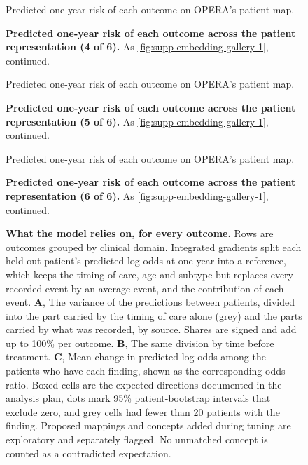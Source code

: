 \begin{figure}[p]
    {Predicted one-year risk of each outcome on OPERA's patient map.}
  \caption{\textbf{Predicted one-year risk of each outcome across the patient representation (4 of 6).}
  As \cref{fig:supp-embedding-gallery-1}, continued.}
  \label{fig:supp-embedding-gallery-4}
\end{figure}

\begin{figure}[p]
    {Predicted one-year risk of each outcome on OPERA's patient map.}
  \caption{\textbf{Predicted one-year risk of each outcome across the patient representation (5 of 6).}
  As \cref{fig:supp-embedding-gallery-1}, continued.}
  \label{fig:supp-embedding-gallery-5}
\end{figure}

\begin{figure}[p]
    {Predicted one-year risk of each outcome on OPERA's patient map.}
  \caption{\textbf{Predicted one-year risk of each outcome across the patient representation (6 of 6).}
  As \cref{fig:supp-embedding-gallery-1}, continued.}
  \label{fig:supp-embedding-gallery-6}
\end{figure}

\begin{figure}[p]
  \caption{\textbf{What the model relies on, for every outcome.} Rows are
  outcomes grouped by clinical domain. Integrated gradients split each held-out
  patient's predicted log-odds at one year into a reference, which keeps the
  timing of care, age and subtype but replaces every recorded event by an
  average event, and the contribution of each event. \textbf{A}, The variance of
  the predictions between patients, divided into the part carried by the timing
  of care alone (grey) and the parts carried by what was recorded, by source.
  Shares are signed and add up to 100\% per outcome. \textbf{B}, The same
  division by time before treatment. \textbf{C}, Mean change in predicted
  log-odds among the patients who have each finding, shown as the corresponding
  odds ratio. Boxed cells are the
  expected directions documented in the analysis plan, dots mark 95\% patient-bootstrap intervals that
  exclude zero, and grey cells had fewer than 20 patients with the finding.
  Proposed mappings and concepts added during tuning are exploratory and
  separately flagged. No unmatched concept is counted as a contradicted expectation.}
  \label{fig:attribution-atlas}
\end{figure}

